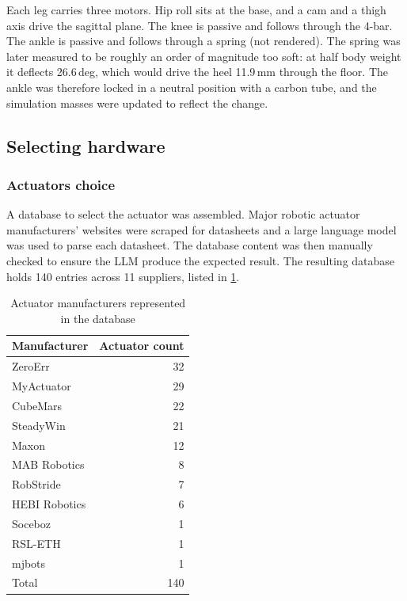 Each leg carries three motors. Hip roll sits at the base, and a cam and a thigh axis drive the
sagittal plane. The knee is passive and follows through the 4-bar. The ankle is passive and follows
through a spring (not rendered). The spring was later measured to be roughly an order of magnitude too soft: at half body weight it deflects 26.6\,deg, which would drive the heel 11.9\,mm through the floor. The ankle was therefore locked in a neutral position with a carbon tube, and the simulation masses were updated to reflect the change.


\newpage 

\subsection{Selecting hardware}
\label{sec:hw-selection}

\subsubsection{Actuators choice}
\label{sec:hw-motor}

A database to select the actuator was assembled.
Major robotic actuator manufacturers' websites were scraped for datasheets and a large language model was used to parse each datasheet.
The database content was then manually checked to ensure the LLM produce the expected result.
The resulting database holds 140 entries across 11 suppliers, listed in \cref{tab:manufacturers}.

\begin{table}[htbp]
\centering
\begin{tabular}{lr}
\toprule
Manufacturer & Actuator count \\
\midrule
ZeroErr       & 32 \\
MyActuator    & 29 \\
CubeMars      & 22 \\
SteadyWin     & 21 \\
Maxon         & 12 \\
MAB Robotics  & 8  \\
RobStride     & 7  \\
HEBI Robotics & 6  \\
Soceboz       & 1  \\
RSL-ETH       & 1  \\
mjbots        & 1  \\
\midrule
Total         & 140 \\
\bottomrule
\end{tabular}
\caption{Actuator manufacturers represented in the database}
\label{tab:manufacturers}
\end{table}

